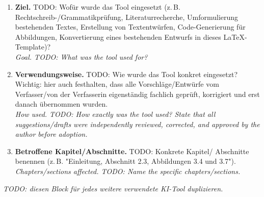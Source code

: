 \begin{enumerate}
    \item \textbf{Ziel.} TODO: Wofür wurde das Tool eingesetzt (z.\,B.
    Rechtschreib-/Grammatikprüfung, Literaturrecherche, Umformulierung
    bestehenden Textes, Erstellung von Textentwürfen, Code-Generierung für
    Abbildungen, Konvertierung eines bestehenden Entwurfs in dieses
    LaTeX-Template)?\\
    \emph{\small\color{dkfzgray2} Goal. TODO: What was the tool used for?}

    \item \textbf{Verwendungsweise.} TODO: Wie wurde das Tool konkret
    eingesetzt? Wichtig: hier auch festhalten, dass alle Vorschläge/Entwürfe
    vom Verfasser/von der Verfasserin eigenständig fachlich geprüft, korrigiert
    und erst danach übernommen wurden.\\
    \emph{\small\color{dkfzgray2} How used. TODO: How exactly was the tool
    used? State that all suggestions/drafts were independently reviewed,
    corrected, and approved by the author before adoption.}

    \item \textbf{Betroffene Kapitel/Abschnitte.} TODO: Konkrete Kapitel/
    Abschnitte benennen (z.\,B. "Einleitung, Abschnitt 2.3, Abbildungen 3.4
    und 3.7").\\
    \emph{\small\color{dkfzgray2} Chapters/sections affected. TODO: Name the
    specific chapters/sections.}
\end{enumerate}

\bigskip
\textit{TODO: diesen Block für jedes weitere verwendete KI-Tool duplizieren.}
